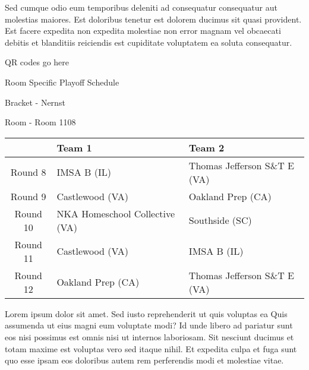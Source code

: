 \documentclass{article}%
\begin{document}
\newline%
Sed cumque odio eum temporibus deleniti ad consequatur consequatur aut molestias maiores. Est doloribus tenetur est dolorem ducimus sit quasi provident. Est facere expedita non expedita molestiae non error magnam vel obcaecati debitis et blanditiis reiciendis est cupiditate voluptatem ea soluta consequatur.%
\vspace*{140pt}%
\begin{center}%
\begin{Huge}%
QR codes go here%
\end{Huge}%
\end{center}%
\newpage%
\begin{center}%
\begin{Huge}%
Room Specific Playoff Schedule%
\end{Huge}%
\vspace*{8pt}%
\linebreak%
\begin{Large}%
Bracket {-} Nernst%
\end{Large}%
\vspace*{8pt}%
\linebreak%
\vspace*{8pt}%
\begin{Large}%
Room {-} Room 1108%
\end{Large}%
\end{center}%
%
\begin{tabularx}{\textwidth}{|c|Y|Y|}%
\hline%
&Team 1&Team 2\\%
\hline%
Round 8&IMSA B (IL)&Thomas Jefferson S\&T E (VA)\\%
Round 9&Castlewood (VA)&Oakland Prep (CA)\\%
Round 10&NKA Homeschool Collective (VA)&Southside (SC)\\%
Round 11&Castlewood (VA)&IMSA B (IL)\\%
Round 12&Oakland Prep (CA)&Thomas Jefferson S\&T E (VA)\\%
\hline%
\end{tabularx}%
\vspace*{8pt}%
\newline%
Lorem ipsum dolor sit amet. Sed iusto reprehenderit ut quis voluptas ea Quis assumenda ut eius magni eum voluptate modi? Id unde libero ad pariatur sunt eos nisi possimus est omnis nisi ut internos laboriosam. Sit nesciunt ducimus et totam maxime est voluptas vero sed itaque nihil. Et expedita culpa et fuga sunt quo esse ipsam eos doloribus autem rem perferendis modi et molestiae vitae.\newline%
\end{document}
